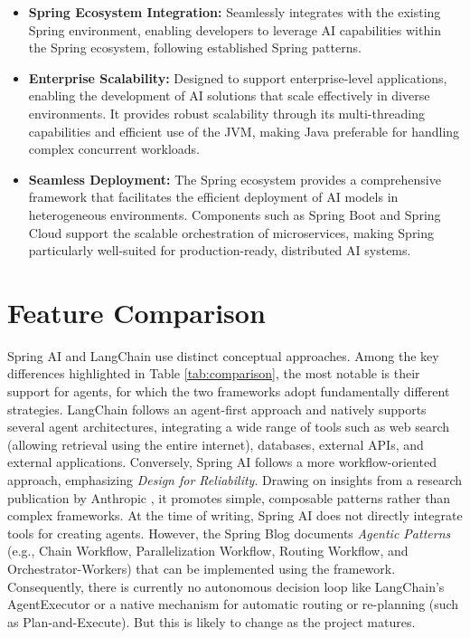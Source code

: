 \begin{itemize}[leftmargin=*, label=--] 
    \item \textbf{Spring Ecosystem Integration:} Seamlessly integrates with the existing Spring environment, enabling developers to leverage AI capabilities within the Spring ecosystem, following established Spring patterns.
    \item \textbf{Enterprise Scalability:} Designed to support enterprise-level applications, enabling the development of AI solutions that scale effectively in diverse environments. It provides robust scalability through its multi-threading capabilities and efficient use of the JVM, making Java preferable for handling complex concurrent workloads.
    \item \textbf{Seamless Deployment:} The Spring ecosystem provides a comprehensive framework that facilitates the efficient deployment of AI models in heterogeneous environments. Components such as Spring Boot and Spring Cloud support the scalable orchestration of microservices, making Spring particularly well-suited for production-ready, distributed AI systems.
\end{itemize}




\section*{Feature Comparison}


Spring AI and LangChain use distinct conceptual approaches. Among the key differences highlighted in Table \ref{tab:comparison}, the most notable is their support for agents, for which the two frameworks adopt fundamentally different strategies. LangChain follows an agent-first approach and natively supports several agent architectures, integrating a wide range of tools such as web search (allowing retrieval using the entire internet), databases, external APIs, and external applications. Conversely, Spring AI follows a more workflow-oriented approach, emphasizing \textit{Design for Reliability}. Drawing on insights from a research publication by Anthropic \cite{schluntz2024building}, it promotes simple, composable patterns rather than complex frameworks. At the time of writing, Spring AI does not directly integrate tools for creating agents. However, the Spring Blog \cite{tzolov2025agentic} documents \textit{Agentic Patterns} (e.g., Chain Workflow, Parallelization Workflow, Routing Workflow, and Orchestrator-Workers) that can be implemented using the framework. Consequently, there is currently no autonomous decision loop like LangChain's AgentExecutor or a native mechanism for automatic routing or re-planning (such as Plan-and-Execute). But this is likely to change as the project matures.


